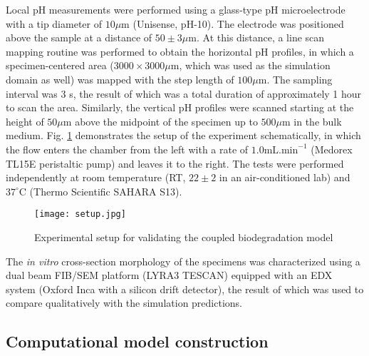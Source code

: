 
Local pH measurements were performed using a glass-type pH microelectrode with a tip diameter of $10\mu\text{m}$ (Unisense, pH-10). The electrode was positioned above the sample at a distance of $50\pm3\mu\text{m}$. At this distance, a line scan mapping routine was performed to obtain the horizontal pH profiles, in which a specimen-centered area ($3000 \times 3000 \mu\text{m}$, which was used as the simulation domain as well) was mapped with the step length of $100\mu\text{m}$. The sampling interval was 3 s, the result of which was a total duration of approximately 1 hour to scan the area. Similarly, the vertical pH profiles were scanned starting at the height of $50\mu\text{m}$ above the midpoint of the specimen up to $500\mu\text{m}$ in the bulk medium. Fig. \ref{fig:kinetics_setup} demonstrates the setup of the experiment schematically, in which the flow enters the chamber from the left with a rate of $1.0\text{mL.min}^{-1}$ (Medorex TL15E peristaltic pump) and leaves it to the right. The tests were performed independently at room temperature (\gls{RT}, $22 \pm 2$ in an air-conditioned lab) and $37^{\circ}\text{C}$ (Thermo Scientific SAHARA S13).


\begin{figure}[h]
\centering
\medskip
\texttt{[image: setup.jpg]}
\caption[Experimental setup for validating the coupled biodegradation model]{Experimental setup for validating the coupled biodegradation model} \label{fig:kinetics_setup}
\end{figure}


The \textit{in vitro} cross-section morphology of the specimens was characterized using a dual beam \gls{FIB}/\gls{SEM} platform (LYRA3 TESCAN) equipped with an \gls{EDX} system (Oxford Inca with a silicon drift detector), the result of which was used to compare qualitatively with the simulation predictions.

\subsection{Computational model construction} \label{sec:kinetics_model}

